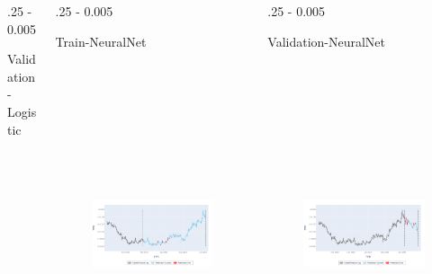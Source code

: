 \documentclass{postertheme}\usepackage[]{graphicx}\usepackage[]{color}
\begin{document}
\begin{frame}
\begin{columns}[onlytextwidth]
\begin{column}{.25 \textwidth - 0.005 \textwidth}
\begin{block}{Validation-Logistic}
    \end{block}
  \end{column}
  
  \begin{column}{.25 \textwidth - 0.005 \textwidth}
    \begin{block}{Train-NeuralNet}
        
      \begin{figure}
        \includegraphics[width=18cm, height=10cm, keepaspectratio=true]{figures/plot-class-train-mlp.png}
      \end{figure}
        
    \end{block}
  \end{column}
  
  \begin{column}{.25 \textwidth - 0.005 \textwidth}
    \begin{block}{Validation-NeuralNet}
        
      \begin{figure}
        \includegraphics[width=18cm, height=10cm, keepaspectratio=true]{figures/plot-class-val-mlp.png}
      \end{figure}
        

\end{block}
\end{column}
\end{columns}
\end{frame}
\end{document}
